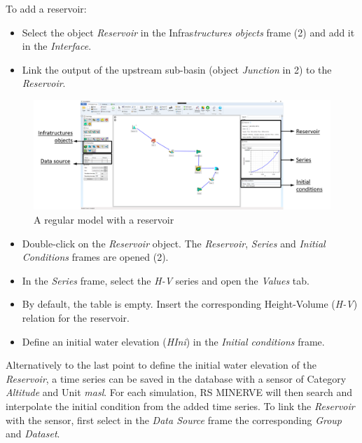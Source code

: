 \documentclass[
  letterpaper,
  DIV=11,
  numbers=noendperiod]{scrreprt}
\begin{document}
To add a reservoir:

\begin{itemize}
\item
  {Select the object \emph{Reservoir} in the Infras\emph{tructures
  objects} frame (2) and add it in the \emph{Interface}.}
\item
  {Link the output of the upstream sub-basin (object \emph{Junction} in
  2) to the \emph{Reservoir}.}
\end{itemize}

\begin{figure}

{\centering \includegraphics{./figures/fig-model_with_reservoir.png}

}

\caption{\label{fig-model_with_reservoir}A regular model with a
reservoir}

\end{figure}

\begin{itemize}
\item
  {Double-click on the \emph{Reservoir} object. The \emph{Reservoir},
  \emph{Series} and \emph{Initial Conditions} frames are opened (2).}
\item
  {In the \emph{Series} frame, select the \emph{H-V} series and open the
  \emph{Values} tab.}
\item
  {By default, the table is empty. Insert the corresponding
  Height-Volume (\emph{H-V}) relation for the reservoir.}
\item
  {Define an initial water elevation (\emph{HIni}) in the \emph{Initial
  conditions} frame.}
\end{itemize}

Alternatively to the last point to define the initial water elevation of
the \emph{Reservoir}, a time series can be saved in the database with a
sensor of Category \emph{Altitude} and Unit \emph{masl}. For each
simulation, RS MINERVE will then search and interpolate the initial
condition from the added time series. To link the \emph{Reservoir} with
the sensor, first select in the \emph{Data Source} frame the
corresponding \emph{Group} and \emph{Dataset}.
\end{document}
